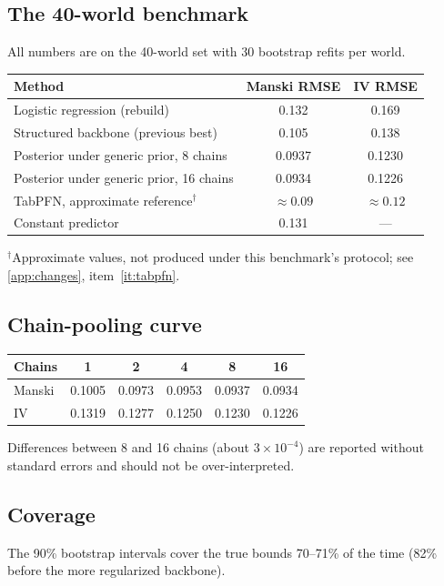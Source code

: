 \documentclass[11pt]{article}
\theoremstyle{definition}
\theoremstyle{remark}
\begin{document}
\subsection{The 40-world benchmark}
All numbers are on the 40-world set with 30 bootstrap refits per world.

\begin{center}
\begin{tabular}{@{}lcc@{}}
\toprule
Method & Manski RMSE & IV RMSE\\
\midrule
Logistic regression (rebuild) & 0.132 & 0.169\\
Structured backbone (previous best) & 0.105 & 0.138\\
Posterior under generic prior, 8 chains & 0.0937 & 0.1230\\
Posterior under generic prior, 16 chains & 0.0934 & 0.1226\\
TabPFN, approximate reference$^{\dagger}$ & $\approx0.09$ & $\approx0.12$\\
Constant predictor & 0.131 & ---\\
\bottomrule
\end{tabular}
\end{center}
{\small $^\dagger$Approximate values, not produced under this benchmark's protocol; see
\cref{app:changes}, item~\ref{it:tabpfn}.}

\subsection{Chain-pooling curve}
\begin{center}
\begin{tabular}{@{}lccccc@{}}
\toprule
Chains & 1 & 2 & 4 & 8 & 16\\
\midrule
Manski & 0.1005 & 0.0973 & 0.0953 & 0.0937 & 0.0934\\
IV & 0.1319 & 0.1277 & 0.1250 & 0.1230 & 0.1226\\
\bottomrule
\end{tabular}
\end{center}
Differences between 8 and 16 chains (about $3\times10^{-4}$) are reported without standard errors and
should not be over-interpreted.

\subsection{Coverage}
The 90\% bootstrap intervals cover the true bounds 70--71\% of the time (82\% before the more
regularized backbone).
\end{document}
